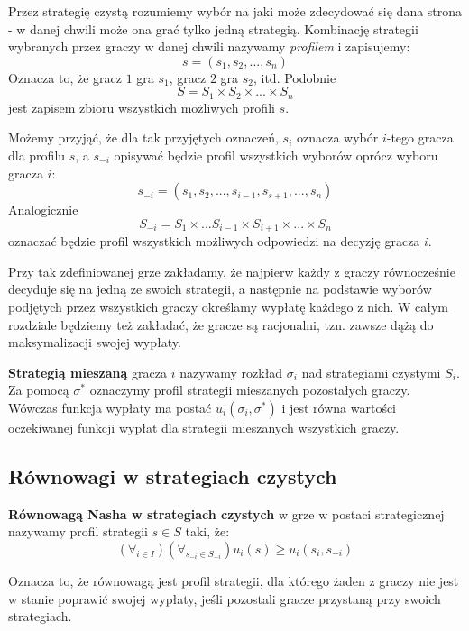 \documentclass[polish]{standalone}
\begin{document}
Przez strategię czystą rozumiemy wybór na jaki może zdecydować się dana strona - w danej chwili może ona grać tylko
jedną strategią. Kombinację strategii wybranych przez graczy w danej chwili nazywamy \textit{profilem} i zapisujemy:
$$s = (s_1, s_2, ..., s_n)$$
Oznacza to, że gracz $1$ gra $s_1$, gracz $2$ gra $s_2$, itd. Podobnie
$$S = S_1 \times S_2 \times ... \times S_n$$
jest zapisem zbioru wszystkich możliwych profili $s$.

Możemy przyjąć, że dla tak przyjętych oznaczeń, $s_i$ oznacza wybór $i$-tego gracza dla profilu $s$, a $s_{-i}$ opisywać
będzie profil wszystkich wyborów oprócz wyboru gracza $i$:
$$s_{-i} = (s_1, s_2, ..., s_{i-1}, s_{s+1}, ..., s_n)$$
Analogicznie
$$S_{-i} = S_1 \times ... S_{i-1} \times S_{i+1} \times ... \times S_n$$
oznaczać będzie profil wszystkich możliwych odpowiedzi na decyzję gracza $i$.

Przy tak zdefiniowanej grze zakładamy, że najpierw każdy z graczy równocześnie decyduje się na jedną ze swoich
strategii, a następnie na podstawie wyborów podjętych przez wszystkich graczy określamy wypłatę każdego z nich.
W całym rozdziale będziemy też zakładać, że gracze są racjonalni, tzn. zawsze dążą do maksymalizacji swojej wypłaty.

\begin{definition}
\textbf{Strategią mieszaną} gracza $i$ nazywamy rozkład $\sigma_i$ nad strategiami czystymi
$S_i$. Za pomocą $\sigma^{*}$ oznaczymy profil strategii mieszanych pozostałych graczy. Wówczas funkcja wypłaty ma
postać $u_i(\sigma_i, \sigma^{*})$ i jest równa wartości oczekiwanej funkcji wypłat dla strategii mieszanych wszystkich
graczy.
\cite[str.~5]{FT-GT}
\end{definition}

\subsection{Równowagi w strategiach czystych}

\begin{definition}
\textbf{Równowagą Nasha w strategiach czystych} w grze w postaci strategicznej nazywamy profil
strategii $s \in S$ taki, że:
$$(\forall_{i \in I}) (\forall_{s_{-i} \in S_{-i}}) u_i(s) \geq u_i(s_i, s_{-i})$$
\cite[str.~11]{FT-GT}
\end{definition}

Oznacza to, że równowagą jest profil strategii, dla którego żaden z graczy nie jest w stanie poprawić swojej wypłaty,
jeśli pozostali gracze przystaną przy swoich strategiach.
\end{document}
